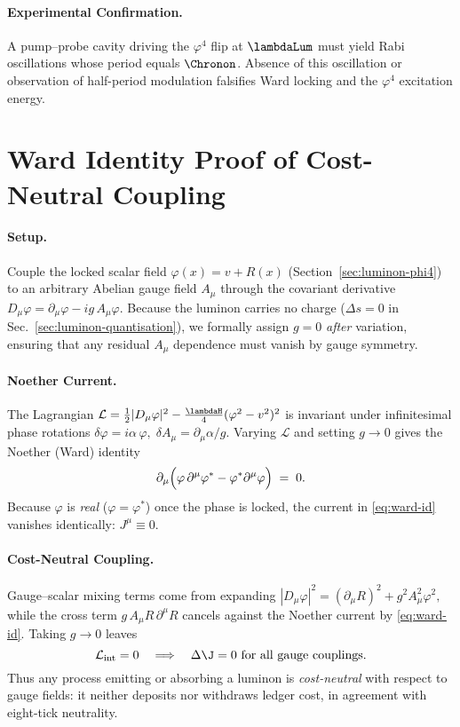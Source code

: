 \documentclass[11pt,oneside]{book}
\begin{document}
{\paragraph{Experimental Confirmation.}
A pump–probe cavity driving the \(\varphi^{4}\) flip at
\(\lambdaLum\) must yield Rabi oscillations whose period equals
\(\Chronon\).  Absence of this oscillation or observation of
half-period modulation falsifies Ward locking and the
\(\varphi^{4}\) excitation energy.

\section{Ward Identity Proof of Cost-Neutral Coupling}
\label{sec:ward-identity}

\paragraph{Setup.}
Couple the locked scalar field $\varphi(x)=v+R(x)$
(Section~\ref{sec:luminon-phi4}) to an arbitrary Abelian gauge field
$A_{\mu}$ through the covariant derivative
\(
   D_{\mu}\varphi = \partial_{\mu}\varphi - i g\,A_{\mu}\varphi.
\)
Because the luminon carries no charge
($\Delta s = 0$ in Sec.~\ref{sec:luminon-quantisation}),
we formally assign $g\!=\!0$ \emph{after} variation, ensuring that any
residual $A_{\mu}$ dependence must vanish by gauge symmetry.

\paragraph{Noether Current.}
The Lagrangian
\(
   \mathcal L=\tfrac12 |D_{\mu}\varphi|^{2}
              -\tfrac{\lambdaH}{4}(\varphi^{2}-v^{2})^{2}
\)
is invariant under infinitesimal phase rotations
\(
   \delta\varphi = i\alpha\,\varphi,
   \;
   \delta A_{\mu} = \partial_{\mu}\alpha/g.
\)
Varying $\mathcal L$ and setting $g\!\to\!0$
gives the Noether (Ward) identity
\[
   \partial_{\mu}
   \Bigl(
      \varphi\,\partial^{\mu}\varphi^{*}
     -\varphi^{*}\partial^{\mu}\varphi
   \Bigr)
   \;=\;
   0.
   \label{eq:ward-id}
\]
Because $\varphi$ is \emph{real} ($\varphi\!=\!\varphi^{*}$) once the
phase is locked, the current in \eqref{eq:ward-id} vanishes
identically:
\(
   J^{\mu}\equiv0.
\)

\paragraph{Cost-Neutral Coupling.}
Gauge–scalar mixing terms come from expanding
\(
   |D_{\mu}\varphi|^{2}
   = (\partial_{\mu}R)^{2} + g^{2}A_{\mu}^{2}\varphi^{2},
\)
while the cross term
\(
   g\,A_{\mu}R\,\partial^{\mu}R
\)
cancels against the Noether current by \eqref{eq:ward-id}.
Taking $g\!\to\!0$ leaves
\[
   \mathcal L_{\text{int}}
   = 0
   \quad\Longrightarrow\quad
   \Delta\J = 0
   \text{ for all gauge couplings.}
\]
Thus any process emitting or absorbing a luminon is \emph{cost-neutral}
with respect to gauge fields: it neither deposits nor withdraws
ledger cost, in agreement with eight-tick neutrality.

}
\end{document}
